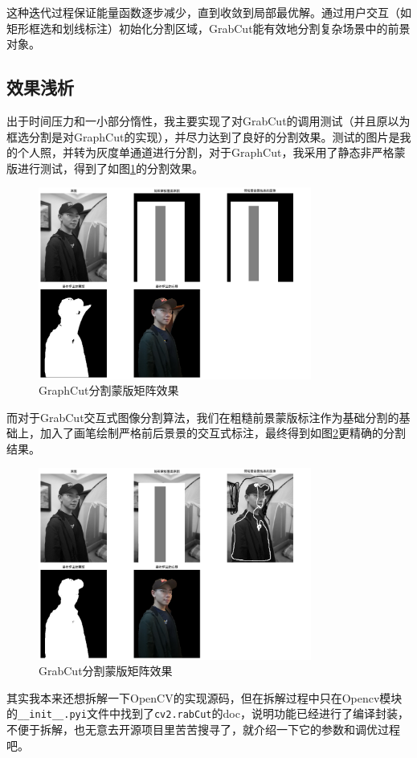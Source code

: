 \documentclass[UTF8]{ctexart}
\begin{document}
这种迭代过程保证能量函数逐步减少，直到收敛到局部最优解。通过用户交互（如矩形框选和划线标注）初始化分割区域，GrabCut能有效地分割复杂场景中的前景对象。
\subsection{效果浅析}
出于时间压力和一小部分惰性，我主要实现了对GrabCut的调用测试（并且原以为框选分割是对GraphCut的实现），并尽力达到了良好的分割效果。测试的图片是我的个人照，并转为灰度单通道进行分割，对于GraphCut，我采用了静态非严格蒙版进行测试，得到了如图\ref{fig:GraphCut}的分割效果。
\begin{figure}[htbp]
\centering
\includegraphics[width=0.8\textwidth]{./images/GraphCut.png}
\caption{GraphCut分割蒙版矩阵效果}
\label{fig:GraphCut}
\end{figure}

而对于GrabCut交互式图像分割算法，我们在粗糙前景蒙版标注作为基础分割的基础上，加入了画笔绘制严格前后景景的交互式标注，最终得到如图\ref{fig:GrabCut}更精确的分割结果。
\begin{figure}[H]
  \centering
  \includegraphics[width=0.8\textwidth]{./images/GrabCut.png}
  \caption{GrabCut分割蒙版矩阵效果}
  \label{fig:GrabCut}
  \end{figure}
其实我本来还想拆解一下OpenCV的实现源码，但在拆解过程中只在Opencv模块的\verb|__init__.pyi|文件中找到了\verb|cv2.rabCut|的doc，说明功能已经进行了编译封装，不便于拆解，也无意去开源项目里苦苦搜寻了，就介绍一下它的参数和调优过程吧。
\end{document}
